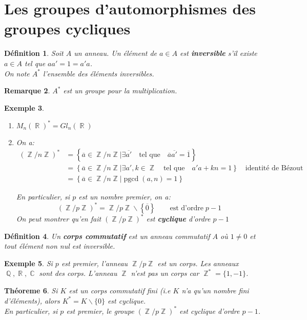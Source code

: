 \documentclass[a4paper, oneside]{report}
\theoremstyle{break}
\newtheorem{thm}{Théoreme}[section] %
\newtheorem{defi}[thm]{Définition}
\newtheorem{definition}[thm]{Définition}
\newtheorem{exem}[thm]{Exemple}
\newtheorem{exemple}[thm]{Exemple}
\newtheorem{remarque}[thm]{Remarque}
\DeclareMathOperator{\R}{\mathbb{R}}
\DeclareMathOperator{\C}{\mathbb{C}}
\DeclareMathOperator{\Z}{\mathbb{Z}}
\DeclareMathOperator{\Q}{\mathbb{Q}}
\DeclarePairedDelimiter\ens{\left\{ }{\right\} }%
\DeclareMathOperator{\pgcd}{pgcd}
\renewcommand{\ens}[1]{\left\{ #1 \right\} }%
\newcommand{\slign}{\textbf}
\newcommand{\ol}{\overline}
\newcommand{\Ens}{\ens}
\begin{document}
\section{Les groupes d'automorphismes des groupes cycliques}

\begin{definition}
Soit $A$ un anneau. Un élément de $a\in A$ est \slign{inversible} s'il existe $a \in A$ tel que $aa' = 1 = a'a$.\\
On note $A^*$ l'ensemble des éléments inversibles.
\end{definition}

\begin{remarque}
$A^*$ est un groupe pour la multiplication.
\end{remarque}

\begin{exemple}
\begin{enumerate}
\item  $M_n(\R)^* = Gl_n(\R)$

\medbreak

\item  On a:
\begin{align*}
(\Z/n\Z)^* &= \Ens{\ol{a} \in \Z/n\Z \big| \exists \ol{a'}	\quad	\text{tel que}	\quad	\ol{a}\ol{a'} = \ol{1}}
\\
&= \Ens{\ol{a} \in \Z/n\Z \big| \exists a', k \in \Z		\quad	\text{tel que}		\quad	a'a+kn = 1}	\quad	\text{identité de Bézout}
\\
&= \Ens{\ol{a} \in \Z/n\Z \big| \pgcd(a,n) = 1}
\end{align*}

En particulier, si $p$ est un nombre premier, on a:
\[
(\Z/p\Z)^* = \Z/p\Z \backslash \ens{\ol{0}}	\qquad	\text{est d'ordre} \; p - 1
\]
On peut montrer qu'en fait $(\Z/p\Z)^*$ est \slign{cyclique} d'ordre $p - 1$
\end{enumerate}
\end{exemple}

\begin{defi}
Un \textbf{corps commutatif} est un anneau commutatif $A$ où $1\neq 0$ et tout élément non nul est inversible.
\end{defi}

\begin{exem}
Si $p$ est premier, l'anneau $\Z/p\Z$ est un corps. Les anneaux $\Q, \R, \C$ sont des corps. L'anneau $\Z$ n'est pas un corps car $\Z^*=\{1,-1\}$.
\end{exem}

\begin{thm}
Si $K$ est un corps commutatif fini (i.e $K$ n'a qu'un nombre fini d'éléments), alors $K^*=K\backslash \{0\}$ est cyclique.\\
En particulier, si $p$ est premier, le groupe $(\Z/p\Z)^*$ est cyclique d'ordre $p-1$.
\end{thm}
\end{document}
